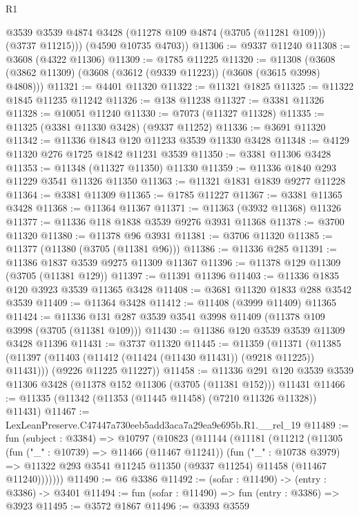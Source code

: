 \begin{lexlean}{R1}
\begin{coremodule}
          @3539
          @3539
          @4874
          @3428
          (@11278 @109 @4874 (@3705 (@11281 @109)))
          (@3737 @11215)))
      (@4590 @10735 @4703))
@11306 := @9337 @11240
@11308 := @3608 (@4322 @11306)
@11309 := @1785 @11225
@11320 := @11308 (@3608 (@3862 @11309) (@3608 (@3612 (@9339 @11223)) (@3608 (@3615 @3998) @4808)))
@11321 := @4401 @11320
@11322 := @11321 @1825
@11325 := @11322 @1845 @11235 @11242
@11326 := @138 @11238
@11327 := @3381 @11326
@11328 := @10051 @11240
@11330 := @7073 (@11327 @11328)
@11335 := @11325 (@3381 @11330 @3428) (@9337 @11252)
@11336 := @3691 @11320
@11342 := @11336 @1843 @120 @11233 @3539 @11330 @3428
@11348 := @4129 @11320 @276 @1725 @1842 @11231 @3539
@11350 := @3381 @11306 @3428
@11353 := @11348 (@11327 @11350) @11330
@11359 := @11336 @1840 @293 @11229 @3541 @11326 @11350
@11363 := @11321 @1831 @1839 @9277 @11228
@11364 := @3381 @11309
@11365 := @1785 @11227
@11367 := @3381 @11365 @3428
@11368 := @11364 @11367
@11371 := @11363 (@3932 @11368) @11326
@11377 := @11336 @118 @1838 @3539 @9276 @3931 @11368
@11378 := @3700 @11320
@11380 := @11378 @96 @3931
@11381 := @3706 @11320
@11385 := @11377 (@11380 (@3705 (@11381 @96)))
@11386 := @11336 @285
@11391 := @11386 @1837 @3539 @9275 @11309 @11367
@11396 := @11378 @129 @11309 (@3705 (@11381 @129))
@11397 := @11391 @11396
@11403 := @11336 @1835 @120 @3923 @3539 @11365 @3428
@11408 := @3681 @11320 @1833 @288 @3542 @3539
@11409 := @11364 @3428
@11412 := @11408 (@3999 @11409) @11365
@11424 := @11336 @131 @287 @3539 @3541 @3998 @11409 (@11378 @109 @3998 (@3705 (@11381 @109)))
@11430 := @11386 @120 @3539 @3539 @11309 @3428 @11396
@11431 := @3737 @11320
@11445 := @11359
    (@11371
      (@11385 (@11397 (@11403 (@11412 (@11424 (@11430 @11431)) (@9218 @11225)) @11431)))
      (@9226 @11225 @11227))
@11458 := @11336
    @291
    @120
    @3539
    @3539
    @11306
    @3428
    (@11378 @152 @11306 (@3705 (@11381 @152)))
    @11431
@11466 := @11335 (@11342 (@11353 (@11445 @11458) (@7210 @11326 @11328)) @11431)
@11467 := LexLeanPreserve.C47447a730eeb5add3aca7a29ea9e695b.R1.__rel_19
@11489 := fun (subject : @3384) =>
  @10797
    (@10823
      (@11144
        (@11181
          (@11212
            (@11305
              (fun ("_" : @10739) => @11466 (@11467 @11241))
              (fun ("_" : @10738 @3979) =>
              @11322 @293 @3541 @11245 @11350 (@9337 @11254) @11458 (@11467 @11240)))))))
@11490 := @6 @3386
@11492 := (sofar : @11490) -> (entry : @3386) -> @3401
@11494 := fun (sofar : @11490) => fun (entry : @3386) => @3923
@11495 := @3572 @1867
@11496 := @3393 @3559

\end{coremodule}
\end{lexlean}
